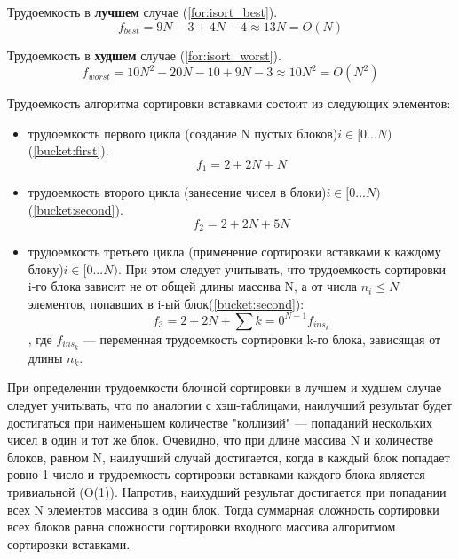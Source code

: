 Трудоемкость в \textbf{лучшем} случае (\ref{for:isort_best}).
\begin{equation}
	\label{for:isort_best}
	f_{best} = 9N - 3 + 4N - 4\approx 13N = O(N)
\end{equation}

Трудоемкость в \textbf{худшем} случае (\ref{for:isort_worst}).
\begin{equation}
	\label{for:isort_worst}
	f_{worst} = 10N^2 - 20N - 10 + 9N - 3\approx 10N^2 = O(N^{2})
\end{equation}


Трудоемкость алгоритма сортировки вставками состоит из следующих элементов:
\begin{itemize}
	\item трудоемкость первого цикла (создание N пустых блоков)$i \in [0...N)$ (\ref{bucket:first}).
	\begin{equation}
		\label{bucket:first}
		f_{1} = 2 + 2N + N
	\end{equation}

	\item трудоемкость второго цикла (занесение чисел в блоки)$i \in [0...N)$ (\ref{bucket:second}).
	\begin{equation}
		\label{bucket:second}
		f_{2} = 2 + 2N + 5N
	\end{equation}

	\item трудоемкость третьего цикла (применение сортировки вставками к каждому блоку)$i \in [0...N)$. При этом следует учитывать, что трудоемкость сортировки i-го блока зависит не от общей длины массива N, а от числа $n_{i} \leq N$ элементов, попавших в i-ый блок(\ref{bucket:second}):
	\begin{equation}
		\label{bucket:insert}
		f_{3} = 2 + 2N + \sum{k=0}^{N-1}f_{ins_{k}}
	\end{equation}, где $f_{ins_{k}}$ --- переменная трудоемкость сортировки k-го блока, зависящая от длины $n_k$.
\end{itemize}

При определении трудоемкости блочной сортировки в лучшем и худшем случае следует учитывать, что по аналогии с хэш-таблицами, наилучший результат будет достигаться при наименьшем количестве "коллизий" --- попаданий нескольких чисел в один и тот же блок. Очевидно, что при длине массива N и количестве блоков, равном N, наилучший случай достигается, когда в каждый блок попадает ровно 1 число и трудоемкость сортировки вставками каждого блока является тривиальной (O(1)). Напротив, наихудший результат достигается при попадании всех N элементов массива в один блок. Тогда суммарная сложность сортировки всех блоков равна сложности сортировки входного массива алгоритмом сортировки вставками.

